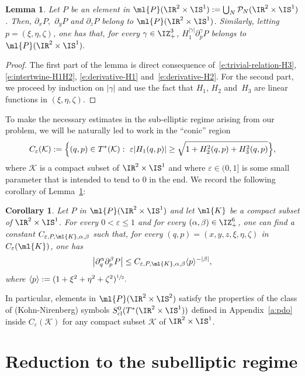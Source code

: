 \documentclass[JEP,XML,SOM,Unicode, NoEqCountersInSection,published]{cedram}
\theoremstyle{plain}
\newtheorem{coro}[theo]{Corollary}
\newtheorem{lemm}[theo]{Lemma}
\theoremstyle{definition}
\theoremstyle{remark}
\begin{document}
\begin{lemm}\label{l:polynomial} Let $P$ be an element in $\ml{P}(\IR^2\times\IS^1) := \bigcup_N \mathcal{P}_N(\IR^2\times\IS^1)$. Then, $\partial_xP,$ $ \partial_yP$ and $\partial_z P$
belong to $\ml{P}(\IR^2\times\IS^1)$. Similarly, letting $p=(\xi,\eta,\zeta)$, one has that, for every $\gamma\in\IZ_+^3$,
$H_1^{|\gamma|}\partial_{p}^{\gamma}P$
belongs to $\ml{P}(\IR^2\times\IS^1).$
\end{lemm}

\begin{proof}
The first part of the lemma is direct consequence of~\eqref{e:trivial-relation-H3}, \eqref{e:intertwine-H1H2}, \eqref{e:derivative-H1} and~\eqref{e:derivative-H2}. For the second part, we proceed by induction on $|\gamma|$ and use the fact that $H_1$, $H_2$ and~$H_3$ are linear functions in $(\xi,\eta,\zeta)$.
\end{proof}

To make the necessary estimates in the sub-elliptic regime arising from our problem, we will be naturally led to work in the ``conic'' region
\begin{equation}%
C_\varepsilon(\mathcal{K}):=\Bigl\{(q,p)\in T^*(\mathcal{K}):\ \varepsilon |H_1(q,p)|\geq \sqrt{1+H_2^2(q,p)+H_3^2(q,p)}\Bigr\},
\end{equation}
where $\mathcal{K}$ is a compact subset of $\IR^2\times\IS^1$ and where $\varepsilon\in(0,1]$ is some small parameter that is intended to tend to $0$ in the end. We record the following corollary of Lemma~\ref{l:polynomial}:
\begin{coro}\label{c:derivative-cone} Let $P$ in $\ml{P}(\IR^2\times\IS^1)$ and let $\ml{K}$ be a compact subset of $\IR^2\times\IS^1$. For every $0<\varepsilon\leq 1$ and for every $(\alpha,\beta)\in\IZ_+^6$, one can find a constant $C_{\varepsilon, P, \ml{K}, \alpha,\beta}$ such that, for every $(q,p)=(x,y,z,\xi,\eta,\zeta)$ in $C_\varepsilon(\ml{K})$, one has
\[
\left|\partial^\alpha_{q}\partial_{p}^\beta P\right|\leq C_{\varepsilon,P, \ml{K},\alpha,\beta}\langle p\rangle^{-|\beta|},
\]
where $\langle p\rangle:=(1+\xi^2+\eta^2+\zeta^2)^{\sfrac{1}{2}}.$
\end{coro}
In particular, elements in $\ml{P}(\IR^2\times\IS^2)$ satisfy the properties of the class of (Kohn-Nirenberg) symbols $S^0_{\textup{cl}}(T^*(\IR^2\times\IS^1))$ defined in Appendix~\ref{a:pdo} inside $C_\varepsilon(\mathcal{K})$ for any compact subset $\mathcal{K}$ of $\IR^2\times\IS^1$.

\section{Reduction to the subelliptic regime}\label{s:cutoff}
\end{document}
